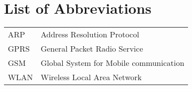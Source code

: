 \chapter*{List of Abbreviations}
\vspace{0.65cm}

\begin{table*}[htbp]
    \begin{tabular}{ll}
        ARP & Address Resolution Protocol \\
        GPRS & General Packet Radio Service \\
        GSM  &  Global System for Mobile communication \\
        WLAN & Wireless Local Area Network \\
    \end{tabular}
\end{table*}
